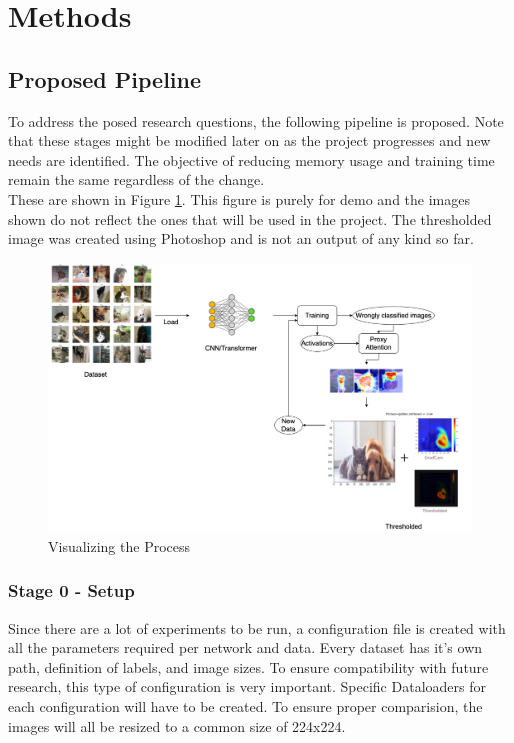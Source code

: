 \section{Methods} \label{section:methods}

\subsection{Proposed Pipeline}
To address the posed research questions, the following pipeline is proposed. Note that these stages might be modified later on as the project progresses and new needs are identified. The objective of reducing memory usage and training time remain the same regardless of the change.\\
These are shown in Figure \ref{fig:process}. This figure is purely for demo and the images shown do not reflect the ones that will be used in the project. The thresholded image was created using Photoshop and is not an output of any kind so far.

\begin{figure}[!htb]
    \centering
    \includegraphics[width=.9\textwidth]{images/thesis_report.drawio.png}
    \caption{Visualizing the Process}
    \label{fig:process}
\end{figure}

\subsubsection*{Stage 0 - Setup}
Since there are a lot of experiments to be run, a configuration file is created with all the parameters required per network and data. Every dataset has it's own path, definition of labels, and image sizes. To ensure compatibility with future research, this type of configuration is very important. Specific Dataloaders for each configuration will have to be created.
To ensure proper comparision, the images will all be resized to a common size of 224x224. 

